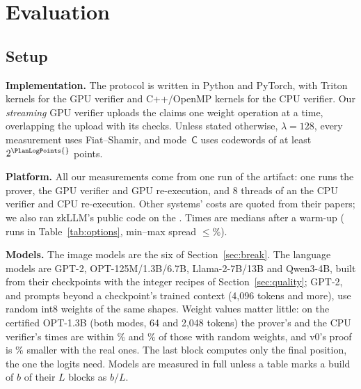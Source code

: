 \providecommand{\Kpre}{\mathsf{K}_{\mathrm{pre}}}
\providecommand{\sC}{\mathsf{C}}
\providecommand{\sK}{\mathsf{K}}
\providecommand{\para}[1]{\par\noindent\textbf{#1}\quad}
\providecommand{\todo}[1]{\textbf{[TODO: #1]}}

\section{Evaluation}
\label{sec:results}

\subsection{Setup}
\label{sec:eval-setup}

\para{Implementation.} The protocol is written in Python and PyTorch, with Triton kernels for the GPU
verifier and C++/OpenMP kernels for the CPU verifier. Our \emph{streaming} GPU verifier uploads the
claims one weight operation at a time, overlapping the upload with its checks. Unless stated otherwise,
$\lambda=128$, every measurement uses Fiat--Shamir, and mode~$\sC$ uses codewords of at least $2^{\PlanLogPoints{}}$ points.

\para{Platform.} All our measurements come from one run of the artifact: one \PlatformGpu{} runs the
prover, the GPU verifier and GPU re-execution, and 8 threads of an \PlatformCpu{} the CPU verifier
and CPU re-execution. Other systems' costs are quoted from their papers; we also ran zkLLM's public
code on the \PlatformGpu{} \ZkllmSameGpuRun{}. Times are medians after a warm-up (\OptionsRuns{} runs
in Table~\ref{tab:options}, min--max spread $\le$\OptionsSpread{}\%).

\para{Models.} The image models are the six of Section~\ref{sec:break}. The language models are
GPT-2, OPT-125M/1.3B/6.7B, Llama-2-7B/13B and Qwen3-4B, built from their checkpoints with the
integer recipes of Section~\ref{sec:quality}; GPT-2, and prompts beyond a checkpoint's trained
context (4{,}096 tokens and more), use random int8 weights of the same shapes. Weight values matter
little: on the certified OPT-1.3B (both modes, 64 and 2{,}048 tokens) the prover's and the CPU
verifier's times are within \RealProveWithin{}\% and \RealVerifyWithin{}\% of those with random
weights, and v0's proof is \RealProofSmaller{}\% smaller with the real ones. The last block computes only the final
position, the one the logits need. Models are measured in full unless a table marks a build of $b$
of their $L$ blocks as $b/L$.

